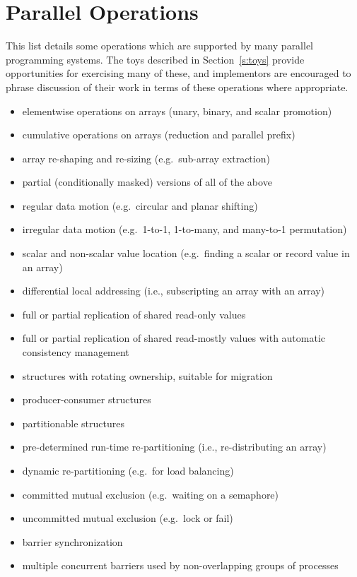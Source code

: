 \section{Parallel Operations\label{s:ops}}

This list details some operations which are supported by many parallel programming systems.
The toys described in Section~\ref{s:toys} provide opportunities for exercising many of these,
and implementors are encouraged to phrase discussion of their work in terms of these operations where appropriate.

\begin{itemize}
\item	elementwise operations on arrays (unary, binary, and scalar promotion)
\item	cumulative operations on arrays (reduction and parallel prefix)
\item	array re-shaping and re-sizing (e.g.\ sub-array extraction)
\item	partial (conditionally masked) versions of all of the above
\item	regular data motion (e.g.\ circular and planar shifting)
\item	irregular data motion (e.g.\ 1-to-1, 1-to-many, and many-to-1 permutation)
\item	scalar and non-scalar value location (e.g.\ finding a scalar or record value in an array)
\item	differential local addressing (i.e., subscripting an array with an array)
\item	full or partial replication of shared read-only values
\item	full or partial replication of shared read-mostly values with automatic consistency management
\item	structures with rotating ownership, suitable for migration
\item	producer-consumer structures
\item	partitionable structures
\item	pre-determined run-time re-partitioning (i.e., re-distributing an array)
\item	dynamic re-partitioning (e.g.\ for load balancing)
\item	committed mutual exclusion (e.g.\ waiting on a semaphore)
\item	uncommitted mutual exclusion (e.g.\ lock or fail)
\item	barrier synchronization
\item	multiple concurrent barriers used by non-overlapping groups of processes

\end{itemize}
